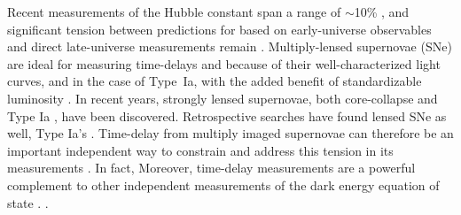 Recent measurements of the Hubble constant \ho span a range of $\sim$10\% \citep[e.g.,][]{abbott2017a, abbott2018b, riess2019a, wong2019a, freedman2019a, freedman2020a, planck2020a, khetan2020a, philcox2020a, choi2020a, dhawan2023a}, 
and significant tension between predictions for \ho based on early-universe observables 
and direct late-universe measurements remain \citep[e.g.,][]{verde2019a}.
Multiply-lensed supernovae (SNe) are 
ideal for measuring time-delays and \ho because of their well-characterized light curves,
and in the case of Type~Ia, with the added benefit of standardizable luminosity \citep{refsdal1964a, treu2010a, oguri2010a, suyu2023a}.
In recent years, strongly lensed supernovae, 
both core-collapse \citep{kelly2015a, rodney2016a} and Type Ia \citep{quimby2014a, goobar2017a, rodney2021a, chen2022a, goobar2023a, pierel2023a, frye2023a}, have been discovered.
Retrospective searches have found lensed SNe as well,  Type Ia's \citep{sheu2023a, magee2023a}.
Time-delay from multiply imaged supernovae  
can therefore be an important independent way to constrain \ho and address this tension in its measurements \citep[e.g.,][]{goldstein2017a, goldstein2018a, goldstein2019a, wojtak2019a, pierel2019a, suyu2020a}. In fact, 
Moreover, time-delay \ho measurements are a powerful complement to other independent measurements of the dark energy equation of state
\citep[e.g.,][]{linder2011a, treu2016a, pierel2021a}.
.

